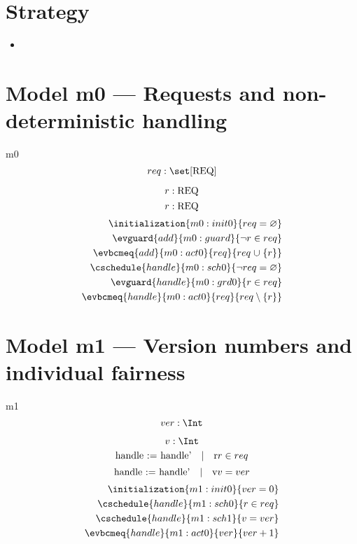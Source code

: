 \documentclass[12pt]{amsart}
\newcommand{\REQ}{\text{REQ}}
\begin{document}
\section{Strategy}

\begin{itemize}
  \item 
\end{itemize}
\section{Model m0 --- Requests and non-deterministic handling}
  
\begin{machine}{m0}
  \newset{\REQ} 
  \[ \variable{ req : \set [\REQ] } \]
  \begin{description}
  \end{description}
  \[ \param{add}{ r : \REQ } \]
  \[ \param{handle}{ r : \REQ } \]
  \begin{align*}
      \initialization{m0:init0}{ req = \emptyset } \\
      \evguard{add}{m0:guard}{ \neg r \in req } \\
      \evbcmeq{add}{m0:act0}{req}{ req \bunion \{ r \} } \\
      \cschedule{handle}{m0:sch0}{ \neg req = \emptyset } \\
      \evguard{handle}{m0:grd0}{ r \in req } \\
      \evbcmeq{handle}{m0:act0}{req}{ req \setminus \{ r \} } 
  \end{align*}

\noindent
\end{machine}
\section{Model m1 --- Version numbers and individual fairness}
  
\begin{machine}{m1}
  \[ \variable{ ver : \Int } \]
  \begin{description}
  \end{description}
  \[ \indices{handle}{ v : \Int } \]
  \[\witness{handle}{r}{r \in req}\]
  \[\witness{handle}{v}{v = ver}\]
  \begin{align}
      \initialization{m1:init0}{ ver = 0 } \\
      \cschedule{handle}{m1:sch0}{ r \in req } \\
      \cschedule{handle}{m1:sch1}{ v = ver } \\
      \evbcmeq{handle}{m1:act0}{ver}{ ver + 1 } 
  \end{align}
\end{machine}
\end{document}
